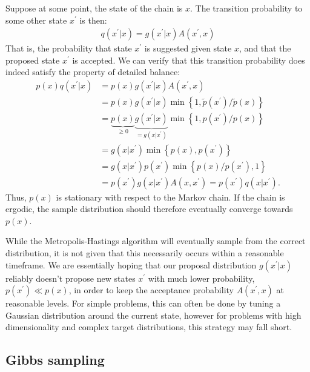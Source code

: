 Suppose at some point, the state of the chain is $x$. The transition probability to some other state $x^\prime$ is then:
\begin{align*}
    q(x^\prime|x) = g(x^\prime | x) A(x^\prime, x)
\end{align*}
That is, the probability that state $x^\prime$ is suggested given state $x$, and that the proposed state $x^\prime$ is accepted. We can verify that this transition probability does indeed satisfy the property of detailed balance:
\begin{align*}
    p(x)q(x^\prime|x) &= p(x)g(x^\prime | x) A(x^\prime, x) \\
                      &= p(x)g(x^\prime | x) \min\left\{1,  \tilde{p}(x^\prime) / \tilde{p}(x)\right\} \\
                      &= \underbrace{p(x)}_{\geq 0} \underbrace{g(x^\prime | x)}_{=g(x | x^\prime)} \min\left\{1,  p(x^\prime) / p(x)\right\} \\
                      &= g(x | x^\prime) \min\left\{p(x), p(x^\prime)\right\} \\
                      &= g(x | x^\prime) p(x^\prime) \min\left\{p(x)/p(x^\prime), 1\right\} \\
                      &= p(x^\prime) g(x | x^\prime)  A(x ,x^\prime) = p(x^\prime) q(x|x^\prime).
\end{align*}
Thus, $p(x)$ is stationary with respect to the Markov chain. If the chain is ergodic, the sample distribution should therefore eventually converge towards $p(x)$. 

While the Metropolis-Hastings algorithm will eventually sample from the correct distribution, it is not given that this necessarily occurs within a reasonable timeframe. 
We are essentially hoping that our proposal distribution $g(x^\prime | x)$ reliably doesn't propose new states $x^\prime$ with much lower probability, $p(x^\prime) \ll p(x) $, in order to keep the acceptance probability $A(x^\prime, x)$ at reasonable levels. 
For simple problems, this can often be done by tuning a Gaussian distribution around the current state, however for problems with high dimensionality and complex target distributions, this strategy may fall short.


\subsection{Gibbs sampling}

